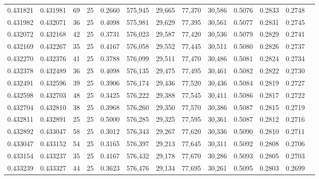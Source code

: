 \begin{tabular}{rrrrrrrrrrrrr}
0.431821 & 0.431981 &    69 &  25 &                                     0.2660 & 575,945 &  29,665 &  77,370 &  30,586 & 0.5076 & 0.2833 & 0.2748 \\
0.431982 & 0.432071 &    36 &  25 &                                     0.4098 & 575,981 &  29,629 &  77,395 &  30,561 & 0.5077 & 0.2831 & 0.2745 \\
0.432072 & 0.432168 &    42 &  25 &                                     0.3731 & 576,023 &  29,587 &  77,420 &  30,536 & 0.5079 & 0.2829 & 0.2741 \\
0.432169 & 0.432267 &    35 &  25 &                                     0.4167 & 576,058 &  29,552 &  77,445 &  30,511 & 0.5080 & 0.2826 & 0.2737 \\
0.432270 & 0.432376 &    41 &  25 &                                     0.3788 & 576,099 &  29,511 &  77,470 &  30,486 & 0.5081 & 0.2824 & 0.2734 \\
0.432378 & 0.432489 &    36 &  25 &                                     0.4098 & 576,135 &  29,475 &  77,495 &  30,461 & 0.5082 & 0.2822 & 0.2730 \\
0.432491 & 0.432596 &    39 &  25 &                                     0.3906 & 576,174 &  29,436 &  77,520 &  30,436 & 0.5084 & 0.2819 & 0.2727 \\
0.432598 & 0.432703 &    48 &  25 &                                     0.3425 & 576,222 &  29,388 &  77,545 &  30,411 & 0.5086 & 0.2817 & 0.2722 \\
0.432704 & 0.432810 &    38 &  25 &                                     0.3968 & 576,260 &  29,350 &  77,570 &  30,386 & 0.5087 & 0.2815 & 0.2719 \\
0.432811 & 0.432891 &    25 &  25 &                                     0.5000 & 576,285 &  29,325 &  77,595 &  30,361 & 0.5087 & 0.2812 & 0.2716 \\
0.432892 & 0.433047 &    58 &  25 &                                     0.3012 & 576,343 &  29,267 &  77,620 &  30,336 & 0.5090 & 0.2810 & 0.2711 \\
0.433047 & 0.433152 &    54 &  25 &                                     0.3165 & 576,397 &  29,213 &  77,645 &  30,311 & 0.5092 & 0.2808 & 0.2706 \\
0.433154 & 0.433237 &    35 &  25 &                                     0.4167 & 576,432 &  29,178 &  77,670 &  30,286 & 0.5093 & 0.2805 & 0.2703 \\
0.433239 & 0.433327 &    44 &  25 &                                     0.3623 & 576,476 &  29,134 &  77,695 &  30,261 & 0.5095 & 0.2803 & 0.2699 \\

\end{tabular}
